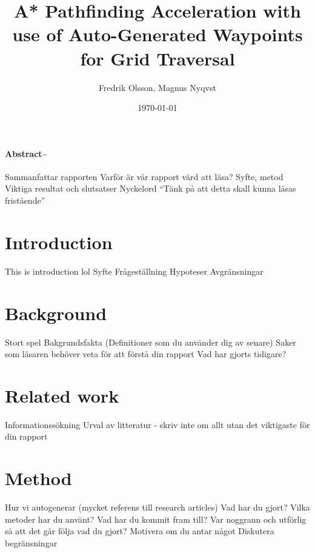 \documentclass[a4paper]{article}
\title{A* Pathfinding Acceleration with use of Auto-Generated Waypoints for Grid Traversal}
\author{Fredrik Olsson, Magnus Nyqvst}
\date{\today}
\begin{document}
\maketitle
\newpage
\thispagestyle{empty}
\paragraph{Abstract--}
Sammanfattar rapporten
Varför är vår rapport värd att läsa?
Syfte, metod
Viktiga resultat och slutsatser Nyckelord
“Tänk på att detta skall kunna läsas fristående”

\tableofcontents
\listoffigures
\newpage
{}
\twocolumn
\section{Introduction}
This is introduction lol \newline
Syfte \newline
Frågeställning \newline
Hypoteser \newline
Avgränsningar

\section{Background}
Stort spel \newline
Bakgrundsfakta (Definitioner som du använder dig av senare) \newline
Saker som läsaren behöver veta för att förstå din rapport \newline
Vad har gjorts tidigare?

\section{Related work}
Informationssökning \newline
Urval av litteratur - skriv inte om allt utan det viktigaste för din rapport

\section{Method}
Hur vi autogenerar (mycket referens till research articles) \newline
Vad har du gjort? \newline
Vilka metoder har du använt? \newline
Vad har du kommit fram till? \newline
Var noggrann och utförlig så att det går följa vad du gjort? \newline
Motivera om du antar något \newline
Diskutera begränsningar
\end{document}
